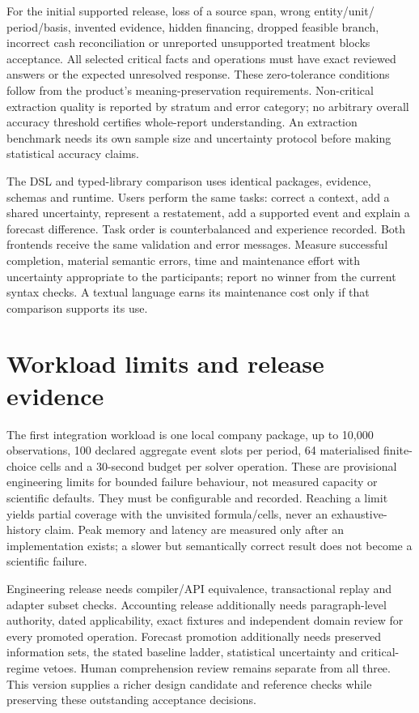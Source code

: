 For the initial supported release, loss of a source span, wrong entity/unit/
period/basis, invented evidence, hidden financing, dropped feasible branch,
incorrect cash reconciliation or unreported unsupported treatment blocks
acceptance. All selected critical facts and operations must have exact
reviewed answers or the expected unresolved response. These zero-tolerance
conditions follow from the product's meaning-preservation requirements.
Non-critical extraction quality is reported by stratum and error category;
no arbitrary overall accuracy threshold certifies whole-report understanding.
An extraction benchmark needs its own sample size and uncertainty protocol
before making statistical accuracy claims.

The DSL and typed-library comparison uses identical packages, evidence,
schemas and runtime. Users perform the same tasks: correct a context, add a
shared uncertainty, represent a restatement, add a supported event and explain
a forecast difference. Task order is counterbalanced and experience recorded.
Both frontends receive the same validation and error messages. Measure
successful completion, material semantic errors, time and maintenance effort
with uncertainty appropriate to the participants; report no winner from the
current syntax checks. A textual language earns its maintenance cost only if
that comparison supports its use.

\section{Workload limits and release evidence}

The first integration workload is one local company package, up to 10,000
observations, 100 declared aggregate event slots per period, 64 materialised
finite-choice cells and a 30-second budget per solver operation. These are
provisional engineering limits for bounded failure behaviour, not measured
capacity or scientific defaults. They must be configurable and recorded.
Reaching a limit yields partial coverage with the unvisited formula/cells,
never an exhaustive-history claim. Peak memory and latency are measured only
after an implementation exists; a slower but semantically correct result
does not become a scientific failure.

Engineering release needs compiler/API equivalence, transactional replay and
adapter subset checks. Accounting release additionally needs paragraph-level
authority, dated applicability, exact fixtures and independent domain review
for every promoted operation. Forecast promotion additionally needs preserved
information sets, the stated baseline ladder, statistical uncertainty and
critical-regime vetoes. Human comprehension review remains separate from all
three. This version supplies a richer design candidate and reference
checks while preserving these outstanding acceptance decisions.
